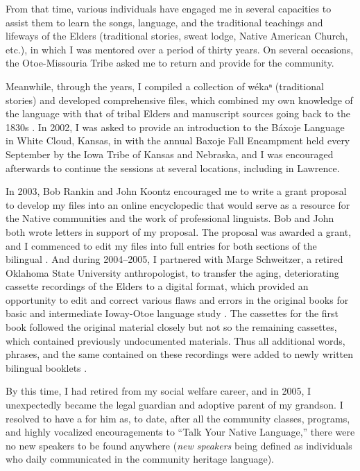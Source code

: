 \documentclass[output=paper]{LSP/langsci}
\begin{document}
From that time, various individuals have engaged me in several capacities to assist them to learn the songs, language, and the traditional teachings and lifeways of the Elders (traditional stories, sweat lodge, Native American Church, etc.), in which I was mentored over a period of thirty years. On several occasions, the Otoe-Missouria Tribe asked me to return and provide  for the community.  

\largerpage
Meanwhile, through the years, I compiled a collection of wékaⁿ (traditional stories) and developed comprehensive  files, which combined my own knowledge of the language with that of tribal Elders and manuscript sources going back to the 1830s \citep{Goodtracks1992}. In 2002, I was asked to provide an introduction to the Báxoje Language in White Cloud, Kansas, in  with the annual Baxoje Fall Encampment held every September by the Iowa Tribe of Kansas and Nebraska, and I was encouraged afterwards to continue the sessions at several locations, including in Lawrence. 

\largerpage
In 2003, Bob Rankin and John Koontz encouraged me to write a grant proposal to develop my  files into an online encyclopedic  that would serve as a resource for the Native communities and the work of professional linguists. Bob and John both wrote letters in support of my proposal. The proposal was awarded a grant, and I commenced to edit my files into full entries for both sections of the bilingual . And during 2004--2005, I partnered with Marge Schweitzer, a retired Oklahoma State University anthropologist, to transfer the aging, deteriorating cassette recordings of the Elders to a digital format, which provided an opportunity to edit and correct various flaws and errors in the original books for basic and intermediate Ioway-Otoe language study \citep{OtoeIowaWistrandRobinson1977, OtoeIowaWistrandRobinson1978}. The cassettes for the first book followed the original material closely but not so the remaining cassettes, which contained previously undocumented materials. Thus all additional words, phrases, and the same contained on these recordings were added to newly written bilingual booklets \citep{Goodtracks2004a, Goodtracks2004b}.

By this time, I had retired from my social welfare career, and in 2005, I unexpectedly became the legal guardian and adoptive parent of my grandson. I resolved to have a  for him as, to date, after all the community classes, programs, and highly vocalized encouragements to ``Talk Your Native Language,'' there were no new speakers to be found anywhere (\emph{new speakers} being defined as individuals who daily communicated in the community heritage language).  
\end{document}
